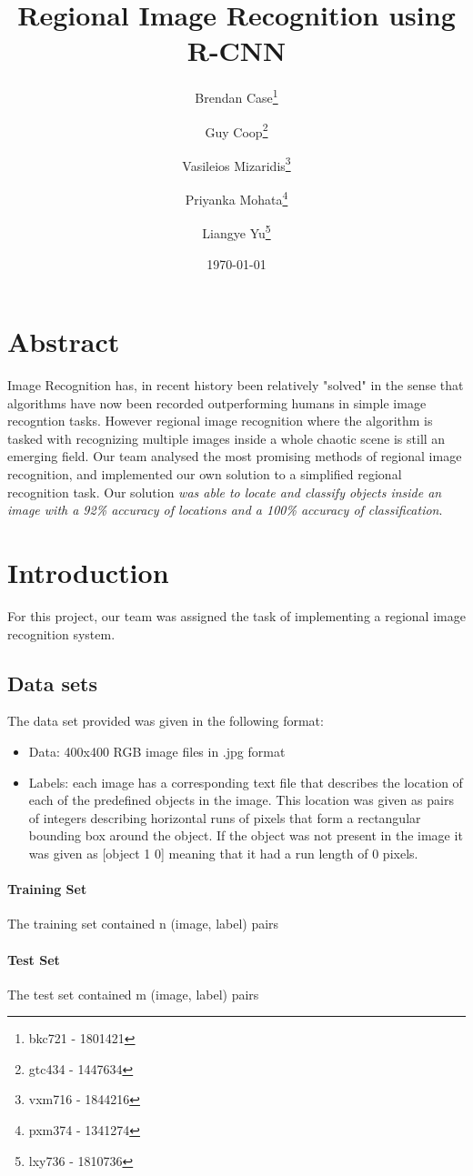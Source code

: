 \documentclass[10pt]{article}
\author{
	Brendan Case{\footnote{bkc721 - 1801421}} 
	\and Guy Coop{\footnote{gtc434 - 1447634}}
	\and Vasileios Mizaridis{\footnote{vxm716 - 1844216}}
	\and Priyanka Mohata{\footnote{pxm374 - 1341274}}
	\and Liangye Yu{\footnote{lxy736 - 1810736}}
	}
\title{Regional Image Recognition using R-CNN}
\date{\today}
\begin{document}
 \maketitle
 
\section*{Abstract}
Image Recognition has, in recent history been relatively "solved" in the sense that algorithms have now been recorded outperforming humans in simple image recogntion tasks. However regional image recognition where the algorithm is tasked with recognizing multiple images inside a whole chaotic scene is still an emerging field. Our team analysed the most promising methods of regional image recognition, and implemented our own solution to a simplified regional recognition task. Our solution {\it was able to locate and classify objects inside an image with a 92\% accuracy of locations and a 100\% accuracy of classification}.


\newpage
\tableofcontents
\newpage

\section{Introduction}
For this project, our team was assigned the task of implementing a regional image recognition system.
\subsection{Data sets}
The data set provided was given in the following format:
\begin{itemize}
	\item Data: 400x400 RGB image files in .jpg format
	\item Labels: each image has a corresponding text file that describes the location of each of the predefined objects in the image. This location was given as pairs of integers describing horizontal runs of pixels that form a rectangular bounding box around the object. If the object was not present in the image it was given as [object 1 0] meaning that it had a run length of 0 pixels.
\end{itemize}
\paragraph{Training Set}
The training set contained n (image, label) pairs 

\paragraph{Test Set}
The test set contained m (image, label) pairs
\end{document}
